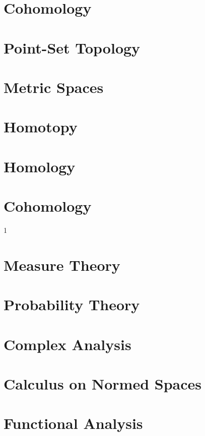 \documentclass{book}                                                           %
\newcommand*{\TOPPATH}{books}
\newcommand*{\PATH}{\TOPPATH/}
\newcounter{endpage}
\def\compileanalysis{1}
\begin{document}
        \part{Cohomology}
    \else
        \part{Point-Set Topology}
        \part{Metric Spaces}
        \part{Homotopy}
        \part{Homology}
        \part{Cohomology}
    \fi
    \clearpage

    \setcounter{endpage}{\thepage}
    \label{book:Analysis}%
    \renewcommand{\PATH}{\TOPPATH/Analysis}
    \setcounter{page}{\value{endpage}}

    \if\compileanalysis1
        \part{Measure Theory}
            
        \part{Probability Theory}
            
        \part{Complex Analysis}
            
        \part{Calculus on Normed Spaces}
            
        \part{Functional Analysis}
            
\end{document}
